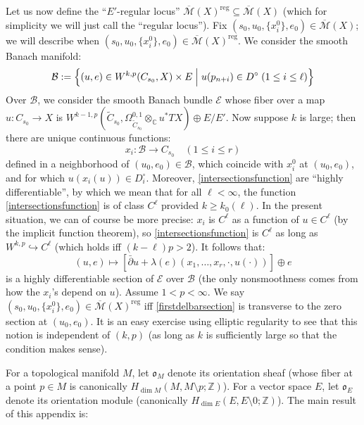 \documentclass[12pt]{article}
\theoremstyle{definition}
\theoremstyle{remark}
\numberwithin{equation}{subsection}
\newcommand{\E}{\mathcal E}
\newcommand{\oo}{\mathfrak o}
\newcommand{\CC}{\mathbb C}
\newcommand{\ZZ}{\mathbb Z}
\newcommand{\B}{\mathcal B}
\newcommand{\Mbar}{\overline{\mathcal M}}
\newcommand{\delbar}{\bar\partial}
\newcommand{\reg}{\mathrm{reg}}
\begin{document}
Let us now define the ``$E'$-regular locus'' $\Mbar(X)^\reg\subseteq\Mbar(X)$ (which for simplicity we will just call the ``regular locus'').  Fix $(s_0,u_0,\{x_i^0\},e_0)\in\Mbar(X)$; we will describe when $(s_0,u_0,\{x_i^0\},e_0)\in\Mbar(X)^\reg$.  We consider the smooth Banach manifold:
\begin{equation}
\B:=\Bigl\{(u,e)\in W^{k,p}(C_{s_0},X)\times E\Bigm|u(p_{n+i})\in D^\circ\;(1\leq i\leq\ell)\Bigr\}
\end{equation}
Over $\B$, we consider the smooth Banach bundle $\E$ whose fiber over a map $u:C_{s_0}\to X$ is $W^{k-1,p}(\tilde C_{s_0},\Omega^{0,1}_{\tilde C_{s_0}}\otimes_\CC u^\ast TX)\oplus E/E'$.  Now suppose $k$ is large; then there are unique continuous functions:
\begin{equation}\label{intersectionsfunction}
x_i:\B\to C_{s_0}\quad(1\leq i\leq r)
\end{equation}
defined in a neighborhood of $(u_0,e_0)\in\B$, which coincide with $x_i^0$ at $(u_0,e_0)$, and for which $u(x_i(u))\in D_i^\circ$.  Moreover, \eqref{intersectionsfunction} are ``highly differentiable'', by which we mean that for all $\ell<\infty$, the function \eqref{intersectionsfunction} is of class $C^\ell$ provided $k\geq k_0(\ell)$.  In the present situation, we can of course be more precise: $x_i$ is $C^\ell$ as a function of $u\in C^\ell$ (by the implicit function theorem), so \eqref{intersectionsfunction} is $C^\ell$ as long as $W^{k,p}\hookrightarrow C^\ell$ (which holds iff $(k-\ell)p>2$).  It follows that:
\begin{equation}\label{firstdelbarsection}
(u,e)\mapsto\left[\delbar u+\lambda(e)(x_1,\ldots,x_r,\cdot,u(\cdot))\right]\oplus e
\end{equation}
is a highly differentiable section of $\E$ over $\B$ (the only nonsmoothness comes from how the $x_i$'s depend on $u$).  Assume $1<p<\infty$.  We say $(s_0,u_0,\{x_i^0\},e_0)\in\Mbar(X)^\reg$ iff \eqref{firstdelbarsection} is transverse to the zero section at $(u_0,e_0)$.  It is an easy exercise using elliptic regularity to see that this notion is independent of $(k,p)$ (as long as $k$ is sufficiently large so that the condition makes sense).

For a topological manifold $M$, let $\oo_M$ denote its orientation sheaf (whose fiber at a point $p\in M$ is canonically $H_{\dim M}(M,M\setminus p;\ZZ)$).  For a vector space $E$, let $\oo_E$ denote its orientation module (canonically $H_{\dim E}(E,E\setminus 0;\ZZ)$).  The main result of this appendix is:
\end{document}
